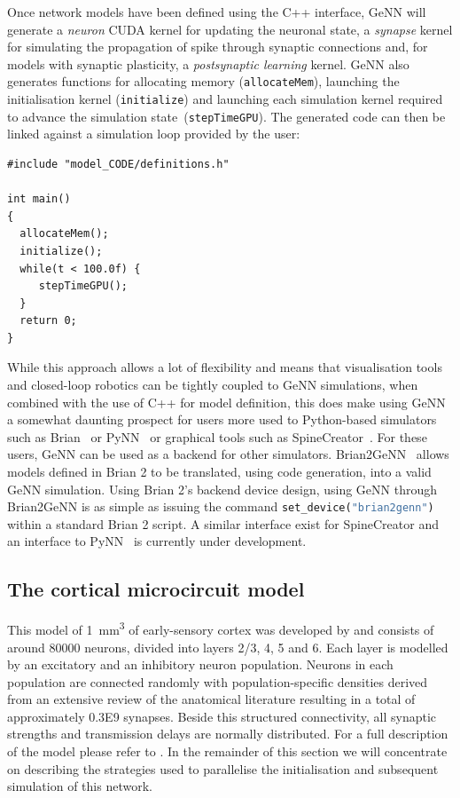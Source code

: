 \documentclass[utf8]{frontiersSCNS} %
\begin{document}
Once network models have been defined using the C++ interface, GeNN will generate a \textit{neuron} CUDA kernel for updating the neuronal state, a \textit{synapse} kernel for simulating the propagation of spike through synaptic connections and, for models with synaptic plasticity, a \textit{postsynaptic learning} kernel. 
GeNN also generates functions for allocating memory (\lstinline{allocateMem}), launching the initialisation kernel (\lstinline{initialize}) and launching each simulation kernel required to advance the simulation state~(\lstinline{stepTimeGPU}).
The generated code can then be linked against a simulation loop provided by the user:
%
\begin{lstlisting}
#include "model_CODE/definitions.h"

int main()
{
  allocateMem();
  initialize();
  while(t < 100.0f) {
     stepTimeGPU();
  }
  return 0;
}
\end{lstlisting}
%
While this approach allows a lot of flexibility and means that visualisation tools and closed-loop robotics can be tightly coupled to GeNN simulations, when combined with the use of C++ for model definition, this does make using GeNN a somewhat daunting prospect for users more used to Python-based simulators such as Brian~\citep{Stimberg2014} or PyNN~\citep{Davison2008a} or graphical tools such as SpineCreator~\citep{Cope2017}.
For these users, GeNN can be used as a backend for other simulators.
Brian2GeNN~\citep{Stimberg2018} allows models defined in Brian 2 to be translated, using code generation, into a valid GeNN simulation. 
Using Brian 2's backend device design, using GeNN through Brian2GeNN is as simple as issuing the command \lstinline[language=python]{set_device("brian2genn")} within a standard Brian 2 script. 
A similar interface exist for SpineCreator and an interface to PyNN~\citep{Davison2008a} is currently under development.
 
\subsection{The cortical microcircuit model}
\label{sec:method/microcircuit}
This model of \SI{1}{\milli\metre\cubed} of early-sensory cortex was developed by \citet{Potjans2012} and consists of around \num{80000} neurons, divided into layers 2/3, 4, 5 and 6.
Each layer is modelled by an excitatory and an inhibitory neuron population.
Neurons in each population are connected randomly with population-specific densities derived from an extensive review of the anatomical literature resulting in a total of approximately \num{0.3E9} synapses.
Beside this structured connectivity, all synaptic strengths and transmission delays are normally distributed.
For a full description of the model please refer to \citeauthor{Potjans2012}.
In the remainder of this section we will concentrate on describing the strategies used to parallelise the initialisation and subsequent simulation of this network.
\end{document}

